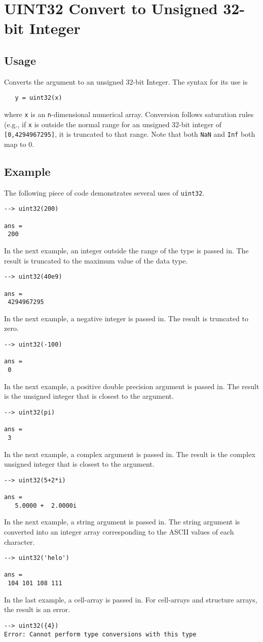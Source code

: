 \section{UINT32 Convert to Unsigned 32-bit Integer}

\subsection{Usage}

Converts the argument to an unsigned 32-bit Integer.  The syntax
for its use is
\begin{verbatim}
   y = uint32(x)
\end{verbatim}
where \verb|x| is an \verb|n|-dimensional numerical array.  Conversion
follows saturation rules (e.g., if \verb|x| is outside the normal
range for an unsigned 32-bit integer of \verb|[0,4294967295]|, it is
truncated to that range. Note that both \verb|NaN| and \verb|Inf| both map to 0.
\subsection{Example}

The following piece of code demonstrates several uses of \verb|uint32|.
\begin{verbatim}
--> uint32(200)

ans = 
 200 
\end{verbatim}
In the next example, an integer outside the range of the type is passed in.  
The result is truncated to the maximum value of the data type.
\begin{verbatim}
--> uint32(40e9)

ans = 
 4294967295 
\end{verbatim}
In the next example, a negative integer is passed in.  The result is 
truncated to zero.
\begin{verbatim}
--> uint32(-100)

ans = 
 0 
\end{verbatim}
In the next example, a positive double precision argument is passed in.  
The result is the unsigned integer that is closest to the argument.
\begin{verbatim}
--> uint32(pi)

ans = 
 3 
\end{verbatim}
In the next example, a complex argument is passed in.  The result is the 
complex unsigned integer that is closest to the argument.
\begin{verbatim}
--> uint32(5+2*i)

ans = 
   5.0000 +  2.0000i 
\end{verbatim}
In the next example, a string argument is passed in.  The string argument 
is converted into an integer array corresponding to the ASCII values of each character.
\begin{verbatim}
--> uint32('helo')

ans = 
 104 101 108 111 
\end{verbatim}
In the last example, a cell-array is passed in.  For cell-arrays and 
structure arrays, the result is an error.
\begin{verbatim}
--> uint32({4})
Error: Cannot perform type conversions with this type
\end{verbatim}
